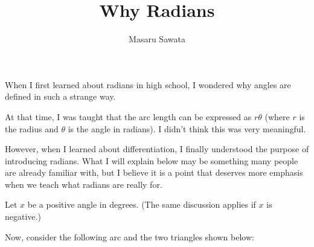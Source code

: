 \documentclass[letterpaper, 12pt]{article}
\title{Why Radians}
\author{Masaru Sawata}
\theoremstyle{custom}
\begin{document}
\maketitle
When I first learned about radians in high school, I wondered why angles are defined in such a strange way.  

At that time, I was taught that the arc length can be expressed as $r\theta$ (where $r$ is the radius and $\theta$ is the angle in radians).  
I didn't think this was very meaningful.  

However, when I learned about differentiation, I finally understood the purpose of introducing radians.  
What I will explain below may be something many people are already familiar with,  
but I believe it is a point that deserves more emphasis when we teach what radians are really for.

Let $x$ be a positive angle in degrees.  
(The same discussion applies if $x$ is negative.)

Now, consider the following arc and the two triangles shown below:
\begin{center}
\end{center}
\end{document}

